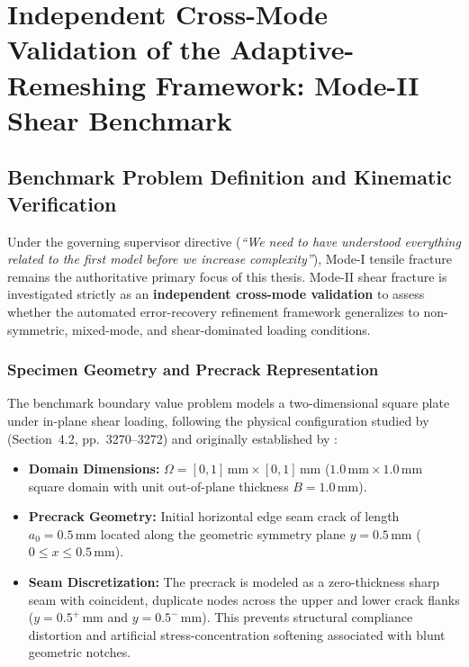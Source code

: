 \section{Independent Cross-Mode Validation of the Adaptive-Remeshing Framework: Mode-II Shear Benchmark}
\label{sec:mode2_shear_benchmark_validation}

\subsection{Benchmark Problem Definition and Kinematic Verification}
\label{subsec:mode2_problem_definition}

Under the governing supervisor directive (\textit{``We need to have understood everything related to the first model before we increase complexity''}), Mode-I tensile fracture remains the authoritative primary focus of this thesis. Mode-II shear fracture is investigated strictly as an \textbf{independent cross-mode validation} to assess whether the automated error-recovery refinement framework generalizes to non-symmetric, mixed-mode, and shear-dominated loading conditions.

\subsubsection{Specimen Geometry and Precrack Representation}
The benchmark boundary value problem models a two-dimensional square plate under in-plane shear loading, following the physical configuration studied by \citet{pandey2025} (Section~4.2, pp.~3270--3272) and originally established by \citet{molnar2017}:
\begin{itemize}
  \item \textbf{Domain Dimensions:} $\Omega = [0, 1]\,\mathrm{mm} \times [0, 1]\,\mathrm{mm}$ ($1.0\,\mathrm{mm} \times 1.0\,\mathrm{mm}$ square domain with unit out-of-plane thickness $B = 1.0\,\mathrm{mm}$).
  \item \textbf{Precrack Geometry:} Initial horizontal edge seam crack of length $a_0 = 0.5\,\mathrm{mm}$ located along the geometric symmetry plane $y = 0.5\,\mathrm{mm}$ ($0 \le x \le 0.5\,\mathrm{mm}$).
  \item \textbf{Seam Discretization:} The precrack is modeled as a zero-thickness sharp seam with coincident, duplicate nodes across the upper and lower crack flanks ($y = 0.5^+\,\mathrm{mm}$ and $y = 0.5^-\,\mathrm{mm}$). This prevents structural compliance distortion and artificial stress-concentration softening associated with blunt geometric notches.
\end{itemize}

